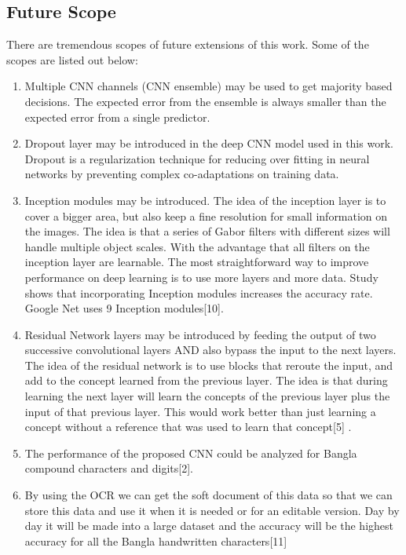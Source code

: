 \documentclass{article}
\begin{document}
\subsection{Future Scope}
There are tremendous scopes of future extensions of this work. Some of the scopes are listed out below: 
\begin{enumerate}
\item Multiple CNN channels (CNN ensemble) may be used to get majority based decisions. The expected error from the ensemble is always smaller than the expected error from a single predictor. 
\item Dropout layer may be introduced in the deep CNN model used in this work. Dropout is a regularization technique for reducing over fitting in neural networks by preventing complex co-adaptations on training data. 
\item Inception modules may be introduced. The idea of the inception layer is to cover a bigger area, but also keep a fine resolution for small information on the images. The idea is that a series of Gabor filters with different sizes will handle multiple object scales. With the advantage that all filters on the inception layer are learnable. The most straightforward way to improve performance on deep learning is to use more layers and more data. Study shows that incorporating Inception modules increases the accuracy rate. Google Net uses 9 Inception modules[10].
\item Residual Network layers may be introduced by feeding the output of two successive convolutional layers AND also bypass the input to the next layers. The idea of the residual network is to use blocks that reroute the input, and add to the concept learned from the previous layer. The idea is that during learning the next layer will learn the concepts of the previous layer plus the input of that previous layer. This would work better than just learning a concept without a reference that was used to learn that concept[5] .
\item The performance of the proposed CNN could be analyzed for Bangla compound characters and digits[2].
\item By using the OCR we can get the soft document of this data so that we can store this data and use it when it is needed or for an editable version. Day by day it will be made into a large dataset and the accuracy will be the highest accuracy for all the Bangla handwritten characters[11]
\end{enumerate}

 
\end{document}
